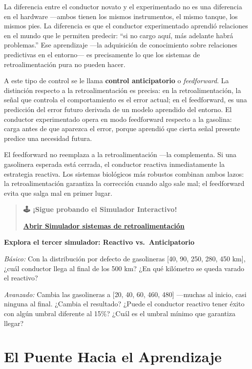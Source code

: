 \documentclass[
  letterpaper,
  DIV=11,
  numbers=noendperiod]{scrreprt}
\begin{document}
\begin{tcolorbox}[enhanced jigsaw, arc=.35mm, bottomrule=.15mm, breakable, colback=white, colframe=quarto-callout-note-color-frame, left=2mm, leftrule=.75mm, opacityback=0, rightrule=.15mm, toprule=.15mm]
La diferencia entre el conductor novato y el experimentado no es una
diferencia en el hardware ---ambos tienen los mismos instrumentos, el
mismo tanque, los mismos pies. La diferencia es que el conductor
experimentado aprendió relaciones en el mundo que le permiten predecir:
``si no cargo aquí, más adelante habrá problemas.'' Ese aprendizaje
---la adquisición de conocimiento sobre relaciones predictivas en el
entorno--- es precisamente lo que los sistemas de retroalimentación pura
no pueden hacer.

A este tipo de control se le llama \textbf{control anticipatorio} o
\emph{feedforward}. La distinción respecto a la retroalimentación es
precisa: en la retroalimentación, la señal que controla el
comportamiento es el error actual; en el feedforward, es una predicción
del error futuro derivada de un modelo aprendido del entorno. El
conductor experimentado opera en modo feedforward respecto a la
gasolina: carga antes de que aparezca el error, porque aprendió que
cierta señal presente predice una necesidad futura.

El feedforward no reemplaza a la retroalimentación ---la complementa. Si
una gasolinera esperada está cerrada, el conductor reactiva
inmediatamente la estrategia reactiva. Los sistemas biológicos más
robustos combinan ambos lazos: la retroalimentación garantiza la
corrección cuando algo sale mal; el feedforward evita que salga mal en
primer lugar.

\begin{quote}
\textbf{🕹️ ¡Sigue probando el Simulador Interactivo!}

\href{https://colab.research.google.com/github/arbouria/Libro-ACA-2026/blob/main/Simuladores/retroalimentacion.ipynb}{\textbf{Abrir
Simulador sistemas de retroalimentación}}
\end{quote}

\textbf{Explora el tercer simulador: Reactivo vs.~Anticipatorio}

\emph{Básico:} Con la distribución por defecto de gasolineras {[}40, 90,
250, 280, 450 km{]}, ¿cuál conductor llega al final de los 500 km? ¿En
qué kilómetro se queda varado el reactivo?

\emph{Avanzado:} Cambia las gasolineras a {[}20, 40, 60, 460, 480{]}
---muchas al inicio, casi ninguna al final. ¿Cambia el resultado? ¿Puede
el conductor reactivo tener éxito con algún umbral diferente al 15\%?
¿Cuál es el umbral mínimo que garantiza llegar?

\section{El Puente Hacia el
Aprendizaje}\label{el-puente-hacia-el-aprendizaje}


\end{tcolorbox}
\end{document}
